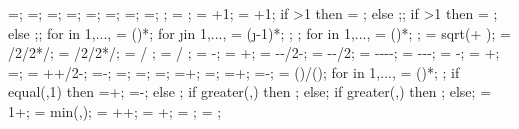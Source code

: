 {{\pilelinethickness=\pilelinethickness;
\latloadshift=\latloadshift;
\toparrlen=\toparrlen;
\basearrlen=\basearrlen;
\drift=\drift;
=;
=;
=;
;
\storyminone = ;
\columnnumber = \baynumber+1; %
\levelnumber = \storynumber+1; %
if \storynumber>1 then {\nlevmo = ;} else {;};
if \baynumber>1 then {\ncolmo = ;} else {;};
for \iii in {1,...,{\levelnumber}}{
\y{\iii} = ()*\storyheight;
for \j in {1,...,{\columnnumber}}{
\x{\j} = (\j-1)*\baywidth;
};
};
for \idefl in {1,...,{\levelnumber}}{
	 = ()*\drift;
};
\tempdim = sqrt( + );
\fixbeamx = \collinet/2/2*/\tempdim;
\fixbeamy = \collinet/2/2*/\tempdim;
 =  / \storyheight * \baywidth;
 =  / \storyheight * \baywidth;
\rigbasestartx = -\supportwidth;
\rigbaseendx = \x{\columnnumber}+\supportwidth;
\isoboty = -\supportheight-\baselinet/2-\isolationdepth;
\isotopy = -\supportheight-\baselinet/2;
\foundboty = -\supportheight-\baselinet-\isolationdepth-\foundationdepth;
\foundtopy = -\supportheight-\baselinet-\isolationdepth;
\foundstartx = -\foundsidew;
\foundendx = \x{\columnnumber}+\foundsidew;
\structheight=\storynumber*\storyheight;
\isomidy = \supportheight+\isolinet+\isolationdepth/2-\baselinet;
\basewallstartx=-\supportwidth;
\buildingwidth=\baynumber*\baywidth;
\basewalldepth=\subfloors*\storyheight;
\basewallstarty=\basewalldepth;
\basewallendx=\buildingwidth+\supportwidth;
\basewallendy=\basewallstarty;
\rightsoilx=\buildingwidth+\rightsoildist;
\rightsoily=\basewalldepth-\rightsoildepth;
\isospace = (\buildingwidth)/();
for \kiso in {1,...,{\numberofisolators}}{
\xiso{\kiso} = ()*\isospace;
};
if equal(\isoshiftyn,1) then
{=+\isoshift;
\xiso{\numberofisolators}=\xiso{\numberofisolators}-\isoshift;}
else {};
if greater(\doflocfloor,\storynumber) then {;} else{};
if greater(\dofloccolumn,\columnnumber) then {;} else{};
\dofloch = 1+\doflocfloor;
\minlen = min(\storyheight,\baywidth);
\dofxx = \x{\dofloccolumn}+\dofoffsetratio*\minlen+;
\dofyy = \y{\dofloch}+\dofoffsetratio*\minlen;
\arrlen = \arrowlenratio*\minlen;
\arrrad = \rotarrowlenratio*\minlen;
}}
